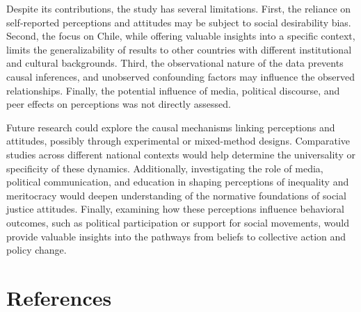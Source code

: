 \documentclass[
  12pt,
]{article}
\begin{document}
Despite its contributions, the study has several limitations. First, the
reliance on self-reported perceptions and attitudes may be subject to
social desirability bias. Second, the focus on Chile, while offering
valuable insights into a specific context, limits the generalizability
of results to other countries with different institutional and cultural
backgrounds. Third, the observational nature of the data prevents causal
inferences, and unobserved confounding factors may influence the
observed relationships. Finally, the potential influence of media,
political discourse, and peer effects on perceptions was not directly
assessed.

Future research could explore the causal mechanisms linking perceptions
and attitudes, possibly through experimental or mixed-method designs.
Comparative studies across different national contexts would help
determine the universality or specificity of these dynamics.
Additionally, investigating the role of media, political communication,
and education in shaping perceptions of inequality and meritocracy would
deepen understanding of the normative foundations of social justice
attitudes. Finally, examining how these perceptions influence behavioral
outcomes, such as political participation or support for social
movements, would provide valuable insights into the pathways from
beliefs to collective action and policy change.

\section{References}\label{references}
\end{document}
